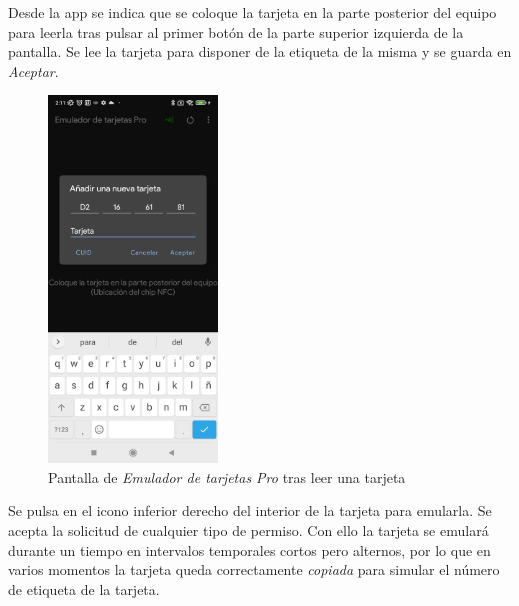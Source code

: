 \documentclass[12pt,a4paper,onecolumn,oneside]{report}
\begin{document}
Desde la app se indica que se coloque la tarjeta en la parte posterior del equipo para leerla tras pulsar al primer botón de la parte superior izquierda de la pantalla. Se lee la tarjeta para disponer de la etiqueta de la misma y se guarda en \textit{Aceptar}.


\begin{figure}[H] 
\centering
  \includegraphics[width=0.4\textwidth]{figuras/root7.png}
  \caption[Pantalla de \textit{Emulador de tarjetas Pro} tras leer una tarjeta]{Pantalla de \textit{Emulador de tarjetas Pro} tras leer una tarjeta\\
  }
  \label{fig:root7}
\end{figure}

Se pulsa en el icono inferior derecho del interior de la tarjeta para emularla. Se acepta la solicitud de cualquier tipo de permiso. Con ello la tarjeta se emulará durante un tiempo en intervalos temporales cortos pero alternos, por lo que en varios momentos la tarjeta queda correctamente \textit{copiada} para simular el número de etiqueta de la tarjeta.
\end{document}

